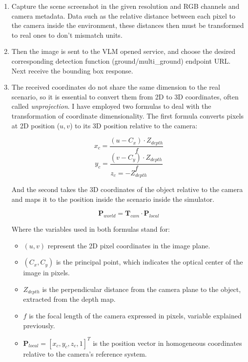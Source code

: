 \begin{enumerate}
	\item Capture the scene screenshot in the given resolution and RGB channels and  camera metadata. Data such as the relative distance between each pixel to the camera inside the environment, these distances then must be transformed to real ones to don't mismatch units.
	
	\item Then the image is sent to the VLM opened service, and choose the desired corresponding detection function (ground/multi\_ground) endpoint URL. Next receive the bounding box response.
	
	\item The received coordinates do not share the same dimension to the real scenario, so it is essential to convert them from 2D to 3D coordinates, often called \textit{unprojection}. I have employed two formulas to deal with the transformation of coordinate dimensionality. The first formula converts pixels at 2D position ($u, v$) to its 3D position relative to the camera: 
	
	$$x_c = \frac{(u - C_x) \cdot Z_{depth}}{f}$$$$y_c = \frac{(v - C_y) \cdot Z_{depth}}{f}$$$$z_c = -Z_{depth}$$
	
	And the second takes the 3D coordinates of the object relative to the camera and maps it to the position inside the scenario inside the simulator.
	
	$$\mathbf{P}_{world} = \mathbf{T}_{cam} \cdot \mathbf{P}_{local}$$
	
	Where the variables used in both formulas stand for:
	
	\begin{itemize}
		\item $(u, v)$ represent the 2D pixel coordinates in the image plane.
		
		\item $(C_x, C_y)$ is the principal point, which indicates the optical center of the image in pixels.
		
		\item $Z_{depth}$ is the perpendicular distance from the camera plane to the object, extracted from the depth map.
		
		\item $f$ is the focal length of the camera expressed in pixels, variable explained previously.
		
		\item $\mathbf{P}_{local} = [x_c, y_c, z_c, 1]^T$ is the position vector in homogeneous coordinates relative to the camera's reference system.
		

\end{itemize}
\end{enumerate}
